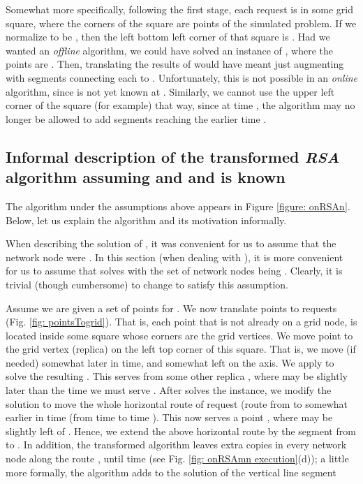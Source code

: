 \documentclass[11pt]{article}
\begin{document}
Somewhat more specifically,
following the first stage,
each request  is in some grid square, where the corners of the square are points of the simulated  problem. If we normalize  to be , then the left bottom left corner of that square is .
Had we wanted an  {\em offline} algorithm, we could have solved an instance of , where the points are  .
Then, translating the results of  would have meant just augmenting with segments connecting each  to .
Unfortunately, this is not possible in an {\em online} algorithm, since   is not yet known at .
Similarly, we cannot use the upper left corner of the square (for example) that way, since at time , the algorithm may no longer be allowed to add segments reaching the earlier time .



\subsection{Informal description of the transformed {\bf\em RSA} algorithm assuming   and  and  is known}
\label{subsec: onRSAn}


The algorithm under the assumptions above appears in Figure \ref{figure: onRSAn}.
Below, let us explain the algorithm and its motivation informally.

When describing the solution of , it was convenient for us to assume that the network node were .
In this section (when dealing with ),
it is more convenient for us to assume that  solves  with the set of network nodes being .
Clearly, it is trivial (though cumbersome) to change  to satisfy this assumption.

Assume we are given a set of points  for .
We now translate  points to  requests (Fig. \ref{fig: pointsTogrid}).
That is, each point  that is not already on a grid node, is located inside some square whose corners are the grid vertices.
We move point  to the grid vertex (replica)  on the left top corner of this square.
That is, we move  (if needed) somewhat later in time, and somewhat left on the  axis.
We apply  to solve the resulting .
This serves  from some other replica , where  may be slightly later than the time  we must serve .
After  solves the  instance, we modify the  solution to move the whole horizontal route
 of request 
(route from  to 
somewhat earlier in time (from time  to time ).
This now serves a point , where  may be slightly left of .
Hence,
we extend the above horizontal route
by the segment from  to .
In addition,
the transformed algorithm leaves extra copies in every network node along the route , until time  (see Fig. \ref{fig: onRSAmn execution}(d));
a little more formally, the algorithm adds to the solution of  the
vertical line segment
\end{document}
